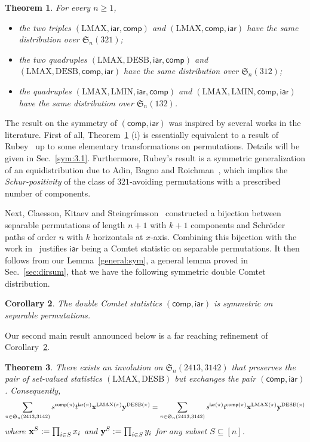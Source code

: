 \documentclass[12pt]{amsart}
\numberwithin{equation}{section}
\theoremstyle{plain}
\newtheorem{theorem}{Theorem}[section]
\newtheorem{corollary}[theorem]{Corollary}
\theoremstyle{definition}
\def\S{\mathfrak{S}}
\def\iar{\mathsf{iar}}
\def\comp{\mathsf{comp}}
\def\LMAX{\mathrm{LMAX}}
\def\LMIN{\mathrm{LMIN}}
\def\DESB{\mathrm{DESB}}
\def\DESB{\mathrm{DESB}}
\begin{document}
\begin{theorem}\label{main:thm1}
For every $n\ge 1$, 
\begin{itemize}
\item[(i)] the two triples $(\LMAX,\iar,\comp)$ and $(\LMAX,\comp,\iar)$ have the same distribution over $\S_n(321)$; 
\item[(ii)] the two quadruples $(\LMAX,\DESB,\iar,\comp)$ and $(\LMAX,\DESB,\comp,\iar)$ have the same distribution over $\S_n(312)$;
\item[(iii)] the quadruples $(\LMAX, \LMIN, \iar, \comp)$ and $(\LMAX, \LMIN, \comp, \iar)$ have the same distribution over $\S_n(132)$.
\end{itemize}
\end{theorem}

The result on the symmetry of $(\comp,\iar)$ was inspired by several works in the literature. First of all, Theorem~\ref{main:thm1} (i) is essentially equivalent to a result of Rubey~\cite{rub} up to some elementary transformations on permutations. Details will be given in Sec.~\ref{sym:3.1}. Furthermore, Rubey's result is a symmetric generalization of an equidistribution due to Adin, Bagno and Roichman~\cite{adin}, which implies the {\em Schur-positivity} of the class of $321$-avoiding permutations with a prescribed number of components. 

Next, Claesson, Kitaev and Steingr\'imsson~\cite[Thm~2.2.48]{kit} constructed a bijection between separable permutations of length $n+1$ with $k+1$ components and Schr\"oder paths of order $n$ with $k$ horizontals at $x$-axis. Combining this bijection with the work in~\cite{FW} justifies $\iar$ being a Comtet statistic on separable permutations. It then follows from our Lemma~\ref{general:sym}, a general lemma proved in Sec.~\ref{sec:dirsum}, that we have the following symmetric double Comtet distribution. 
\begin{corollary}\label{sym:separ}
The double Comtet statistics $(\comp,\iar)$ is symmetric on separable permutations. 
\end{corollary}

Our second main result announced below  is a far reaching refinement of  Corollary~\ref{sym:separ}. 


\begin{theorem}\label{thm:sep:sym}
There exists an involution  on $\S_n(2413,3142)$ that preserves the pair of set-valued statistics $(\LMAX,\DESB)$ but exchanges the pair $(\comp,\iar)$. Consequently,
$$
\sum_{\pi\in\S_n(2413,3142)}s^{\comp(\pi)}t^{\iar(\pi)}{\bf x}^{\LMAX(\pi)}{\bf y}^{\DESB(\pi)}=\sum_{\pi\in\S_n(2413,3142)}s^{\iar(\pi)}t^{\comp(\pi)}{\bf x}^{\LMAX(\pi)}{\bf y}^{\DESB(\pi)}
$$
where ${\bf x}^S:=\prod_{i\in S}x_i$ and ${\bf y}^S:=\prod_{i\in S}y_i$ for any subset $S\subseteq[n]$.  
\end{theorem}
\end{document}
